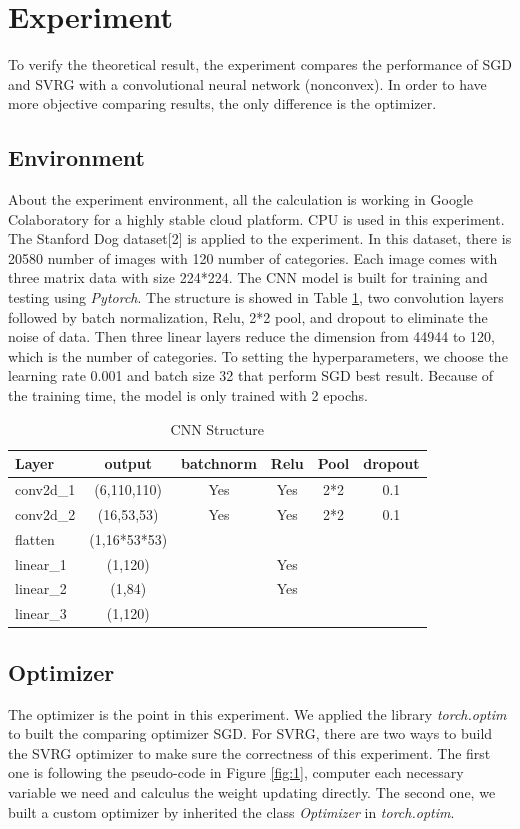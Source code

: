 \documentclass{article}
\begin{document}
\section{Experiment}
To verify the theoretical result, the experiment compares the performance of SGD and SVRG with a convolutional neural network (nonconvex). In order to have more objective comparing results, the only difference is the optimizer.
\subsection{Environment}
About the experiment environment, all the calculation is working in Google Colaboratory for a highly stable cloud platform. CPU is used in this experiment. The Stanford Dog dataset[2] is applied to the experiment. In this dataset, there is 20580 number of images with 120 number of categories. Each image comes with three matrix data with size 224*224. The CNN model is built for training and testing using \emph{Pytorch}. The structure is showed in Table \ref{tab:1}, two convolution layers followed by batch normalization, Relu, 2*2 pool, and dropout to eliminate the noise of data. Then three linear layers reduce the dimension from 44944 to 120, which is the number of categories.
To setting the hyperparameters, we choose the learning rate 0.001 and batch size 32 that perform SGD best result. Because of the training time, the model is only trained with 2 epochs.
\newline
\begin{table}
\caption {CNN Structure} \label{tab:1} 
\begin{center}
\begin{tabular}{|l|c|c|c|c|c|}
\hline 
Layer&output&batchnorm&Relu&Pool&dropout\\
\hline  
conv2d_1&(6,110,110)&Yes&Yes&2*2&0.1\\
conv2d_2&(16,53,53)&Yes&Yes&2*2&0.1\\
flatten&(1,16*53*53)&&&&\\
linear_1&(1,120)&&Yes&&\\
linear_2&(1,84)&&Yes&&\\
linear_3&(1,120)&&&&\\
\hline 
\end{tabular}
\end{center}
\end{table}
\subsection{Optimizer}
The optimizer is the point in this experiment. We applied the library \emph{torch.optim} to built the comparing optimizer SGD. For SVRG, there are two ways to build the SVRG optimizer to make sure the correctness of this experiment. The first one is following the pseudo-code in Figure \ref{fig:1}, computer each necessary variable we need and calculus the weight updating directly. The second one, we built a custom optimizer by inherited the class \emph{Optimizer} in \emph{torch.optim}.
\end{document}

